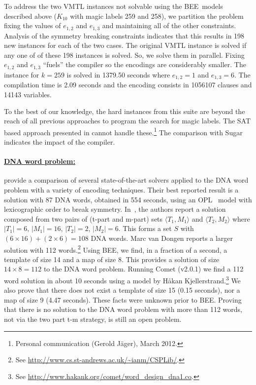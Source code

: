 \documentclass{tlp}
\newcommand\tuple[1]{\langle #1 \rangle}
\newcommand{\bee}{\textsf{BEE}}
\begin{document}
To address the two VMTL instances not solvable using the \bee\ models
described above ($K_{10}$ with magic labels 259 and 258), we partition
the problem fixing the values of $e_{1,2}$ and $e_{1,3}$ and
maintaining all of the other constraints. Analysis of the symmetry
breaking constraints indicates that this results in 198 new instances
for each of the two cases. The original VMTL instance is solved
if any one of of these 198 instances is solved. So, we solve them in
parallel. Fixing $e_{1,2}$ and $e_{1,3}$ ``fuels'' the compiler so the
encodings are considerably smaller.
The instance for $k= 259$ is solved in 1379.50 seconds where
$e_{1,2}=1$ and $e_{1,3}=6$. The compilation time is 2.09 seconds and
the encoding consists in 1056107 clauses and 14143 variables.


To the best of our knowledge, the hard instances from this suite are
beyond the reach of all previous approaches to program the search for
magic labels. The SAT based approach presented in \cite{Jaeger2010}
cannot handle these.\footnote{Personal communication (Gerold J\"ager),
  March 2012.} The comparison with Sugar indicates the impact of the
compiler.  


\vspace{-3mm}
\paragraph{\underline{DNA word problem:}}

 provide a comparison of
several state-of-the-art solvers applied to the DNA word problem with
a variety of encoding techniques. Their best reported result is
a solution with 87 DNA words, obtained in 554 seconds, using an
OPL~\cite{opl} model with lexicographic order to break symmetry.
In~\cite{dnaWordPaper}, the authors report a solution composed from
two pairs of (t-part and m-part) sets $\tuple{T_1,M_1}$ and
$\tuple{T_2,M_2}$ where $|T_1|=6$, $|M_1|=16$, $|T_2|=2$,
$|M_2|=6$. This forms a set $S$ with $(6\times 16)+(2\times 6)=108$
DNA words.
Marc van Dongen reports a larger solution with 112
words.\footnote{See
  \url{http://www.cs.st-andrews.ac.uk/~ianm/CSPLib/}.}
Using \bee, we find, in a fraction of a second, a template of size 14
and a map of size 8. This provides a solution of size $14\times 8=112$
to the DNA word problem. Running Comet (v2.0.1) we find a 112 word
solution in about 10 seconds using a model by H\aa kan
Kjellerstrand.\footnote{See
  \url{http://www.hakank.org/comet/word_design_dna1.co}.}
We also prove that there does not exist a template of size 15 (0.15
seconds), nor a map of size 9 (4.47 seconds). These facts were unknown
prior to \bee.
Proving that there is no solution to the DNA word problem with
more than 112 words, not via the two part t-m strategy, is still an
open problem.
\end{document}
